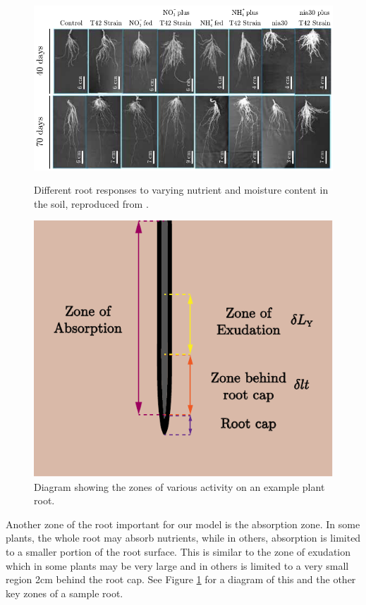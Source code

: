 \documentclass[11pt]{article}
\numberwithin{equation}{section}
\begin{document}
\begin{figure}
\centering
\begin{minipage}{.45\textwidth}
    \centering
    \includegraphics[width=\linewidth]{Figures/rootMorphology.pdf}
    \caption{ Different root responses to varying nutrient and moisture content in the soil, reproduced from \cite{PURNOBASUKI20182012}.}
    \label{fig:roots}
\end{minipage}%
\hfill
\begin{minipage}{.45\textwidth}
  \centering
    \includegraphics[width=.6\textwidth]{Figures/ZonesDiagram-plot.pdf}
    \caption{Diagram showing the zones of various activity on an example plant root.}
    \label{fig:zones}
\end{minipage}
\end{figure}

Another zone of the root important for our model is the absorption zone. In some plants, the whole root may absorb nutrients, while in others, absorption is limited to a smaller portion of the root surface. This is similar to the zone of exudation which in some plants may be very large and in others is limited to a very small region 2cm behind the root cap. See Figure \ref{fig:zones} for a diagram of this and the other key zones of a sample root.
\end{document}
